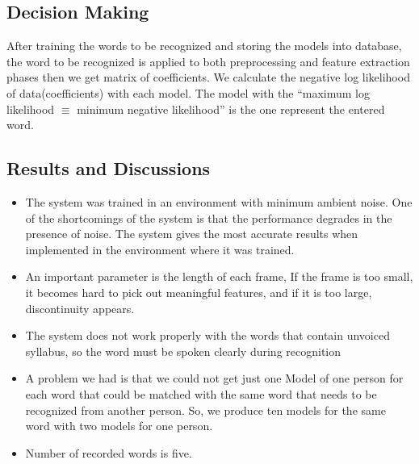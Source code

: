 \documentclass[12pt, a4paper, twoside]{report}
\begin{document}
\subsection{Decision Making}
After training the words to be recognized and storing the models into database, the word to be recognized is applied to both preprocessing and feature extraction phases then we get matrix of coefficients.
We calculate the negative log likelihood of data(coefficients) with each model. 
The model with the ``maximum log likelihood $\equiv$ minimum negative likelihood'' is the one represent the entered word.
\subsection{Results and Discussions}
\begin{itemize}[noitemsep]
\item The system was trained in an environment with minimum ambient noise. One of the shortcomings of the system is that the performance degrades in the presence of noise. The system gives the most accurate results when implemented in the environment where it was trained.
\item An important parameter is the length of each frame, If the frame is too small, it becomes hard to pick out meaningful features, and if it is too large, discontinuity appears.
\item The system does not work properly with the words that contain unvoiced syllabus, so the word must be spoken clearly during recognition 
\item A problem we had is that we could not get just one Model of one person for each word that could be matched with the same word that needs to be recognized from another person. So, we produce ten models for the same word with two models for one person. 
\item Number of recorded words is five.
\end{itemize}
\end{document}
